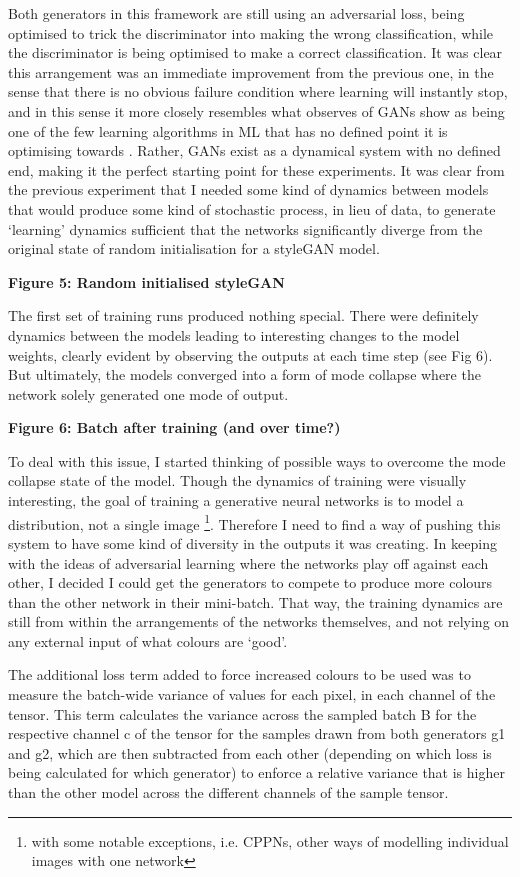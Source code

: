Both generators in this framework are still using an adversarial loss, being optimised to trick the discriminator into making the wrong classification, while the discriminator is being optimised to make a correct classification. 
It was clear this arrangement was an immediate improvement from the previous one, in the sense that there is no obvious failure condition where learning will instantly stop, and in this sense it more closely resembles what observes of GANs show as being one of the few learning algorithms in ML that has no defined point it is optimising towards \citep{nagarajan2017gradient}. 
Rather, GANs exist as a dynamical system with no defined end, making it the perfect starting point for these experiments. 
It was clear from the previous experiment that I needed some kind of dynamics between models that would produce some kind of stochastic process, in lieu of data, to generate ‘learning’ dynamics sufficient that the networks significantly diverge from the original state of random initialisation for a styleGAN model. 

\textbf{Figure 5: Random initialised styleGAN}

The first set of training runs produced nothing special. 
There were definitely dynamics between the models leading to interesting changes to the model weights, clearly evident by observing the outputs at each time step (see Fig 6). 
But ultimately, the models converged into a form of mode collapse where the network solely generated one mode of output. 

\textbf{Figure 6: Batch after training (and over time?)}

To deal with this issue, I started thinking of possible ways to overcome the mode collapse state of the model. 
Though the dynamics of training were visually interesting, the goal of training a generative neural networks is to model a distribution, not a single image \footnote{with some notable exceptions, i.e. CPPNs, other ways of modelling individual images with one network}. 
Therefore I need to find a way of pushing this system to have some kind of diversity in the outputs it was creating. In keeping with the ideas of adversarial learning where the networks play off against each other, I decided I could get the generators to compete to produce more colours than the other network in their mini-batch. 
That way, the training dynamics are still from within the arrangements of the networks themselves, and not relying on any external input of what colours are ‘good’.

The additional loss term added to force increased colours to be used was to measure the batch-wide variance of values for each pixel, in each channel of the tensor. 
This term calculates the variance across the sampled batch B for the respective channel c of the tensor for the samples drawn from both generators g1 and g2, which are then subtracted from each other (depending on which loss is being calculated for which generator) to enforce a relative variance that is higher than the other model across the different channels of the sample tensor.

